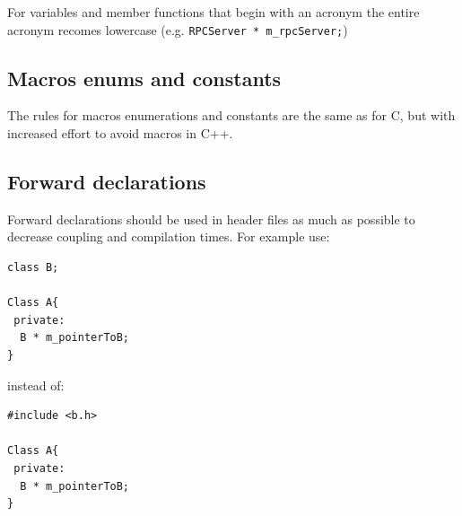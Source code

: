 \documentclass[12pt]{article}
\newenvironment{sourcestyle}{}{}%
\begin{document}
For variables and member functions that begin with an acronym the entire acronym recomes lowercase (e.g. {\tt RPCServer * m\_rpcServer;})
\subsection{Macros enums and constants}
The rules for macros enumerations and constants are the same as for C, but with increased effort to avoid macros in C++.

\subsection{Forward declarations}
Forward declarations should be used in header files as much as possible to decrease coupling and compilation times.
For example use:
\begin{sourcestyle}
\begin{verbatim}
class B;

Class A{
 private:
  B * m_pointerToB;
}
\end{verbatim}
\end{sourcestyle}
instead of:
\begin{sourcestyle}
\begin{verbatim}
#include <b.h>

Class A{
 private:
  B * m_pointerToB;
}
\end{verbatim}
\end{sourcestyle}
\end{document}

